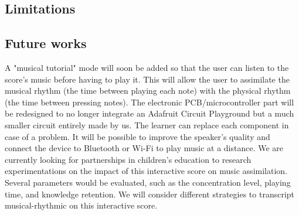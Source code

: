\subsection{Limitations}


\subsection{Future works}

A "musical tutorial" mode will soon be added so that the user can listen to the score's
music before having to play it. This will allow the user to assimilate the musical rhythm
(the time between playing each note) with the physical rhythm (the time between
pressing notes).
The electronic PCB/microcontroller part will be redesigned to no longer integrate an
Adafruit Circuit Playground but a much smaller circuit entirely made by us. The
learner can replace each component in case of a problem. It will be possible to
improve the speaker's quality and connect the device to Bluetooth or Wi-Fi to play
music at a distance.
We are currently looking for partnerships in children's education to research
experimentations on the impact of this interactive score on music assimilation. Several
parameters would be evaluated, such as the concentration level, playing time, and
knowledge retention. We will consider different strategies to transcript musical-rhythmic on this interactive score.